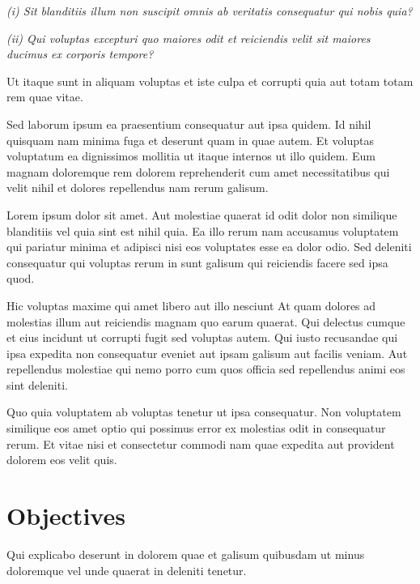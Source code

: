     \textit{(i) Sit blanditiis illum non suscipit omnis ab veritatis consequatur qui nobis quia?} 

    \textit{(ii) Qui voluptas excepturi quo maiores odit et reiciendis velit sit maiores ducimus ex corporis tempore?} 

Ut itaque sunt in aliquam voluptas et iste culpa et corrupti quia aut totam totam rem quae vitae.

\vspace{5mm} Sed laborum ipsum ea praesentium consequatur aut ipsa quidem. Id nihil quisquam nam minima fuga et deserunt quam in quae autem. Et voluptas voluptatum ea dignissimos mollitia ut itaque internos ut illo quidem. Eum magnam doloremque rem dolorem reprehenderit cum amet necessitatibus qui velit nihil et dolores repellendus nam rerum galisum. 

\vspace{5mm} Lorem ipsum dolor sit amet. Aut molestiae quaerat id odit dolor non similique blanditiis vel quia sint est nihil quia. Ea illo rerum nam accusamus voluptatem qui pariatur minima et adipisci nisi eos voluptates esse ea dolor odio. Sed deleniti consequatur qui voluptas rerum in sunt galisum qui reiciendis facere sed ipsa quod. 

\vspace{5mm} 
Hic voluptas maxime qui amet libero aut illo nesciunt At quam dolores ad molestias illum aut reiciendis magnam quo earum quaerat. Qui delectus cumque et eius incidunt ut corrupti fugit sed voluptas autem. Qui iusto recusandae qui ipsa expedita non consequatur eveniet aut ipsam galisum aut facilis veniam. Aut repellendus molestiae qui nemo porro cum quos officia sed repellendus animi eos sint deleniti. 

\vspace{5mm} Quo quia voluptatem ab voluptas tenetur ut ipsa consequatur. Non voluptatem similique eos amet optio qui possimus error ex molestias odit in consequatur rerum. Et vitae nisi et consectetur commodi nam quae expedita aut provident dolorem eos velit quis. 


\section{Objectives}
\label{c1_s:objectives}
Qui explicabo deserunt in dolorem quae et galisum quibusdam ut minus doloremque vel unde quaerat in deleniti tenetur.

